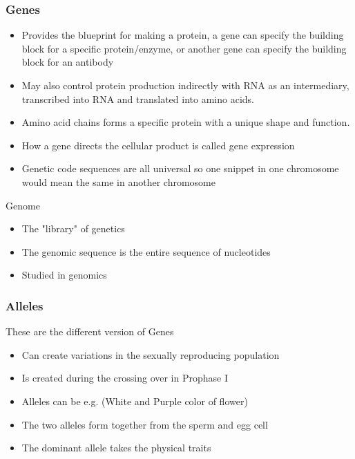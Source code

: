 \documentclass{article}
\begin{document}
\subsubsection*{Genes}
\begin{itemize}
    \item Provides the blueprint for making a protein, a gene can specify the building block for a specific protein/enzyme, or another gene can specify the building block for an antibody
    \item May also control protein production indirectly with RNA as an intermediary, transcribed into RNA and translated into amino acids.
    \item Amino acid chains forms a specific protein with a unique shape and function.
    \item How a gene directs the cellular product is called gene expression
    \item Genetic code sequences are all universal so one snippet in one chromosome would mean the same in another chromosome
\end{itemize}


Genome
\begin{itemize}
    \item The "library" of genetics
    \item The genomic sequence is the entire sequence of nucleotides
    \item Studied in genomics
\end{itemize}


\subsubsection*{Alleles}
These are the different version of Genes
\begin{itemize}
    \item Can create variations in the sexually reproducing population
    \item Is created during the crossing over in Prophase I
    \item Alleles can be e.g. (White and Purple color of flower)
    \item The two alleles form together from the sperm and egg cell
    \item The dominant allele takes the physical traits
\end{itemize}
\end{document}
